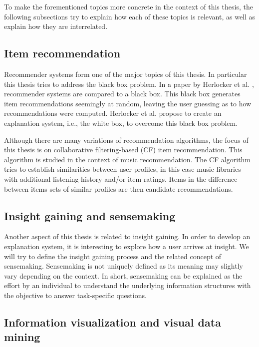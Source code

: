 To make the forementioned topics more concrete in the context of this thesis, the following subsections try to explain how each of these topics is relevant, as well as explain how they are interrelated.


\subsection{Item recommendation}\label{chapter:introduction:section:perspective:subsection:recommendation}

Recommender systems form one of the major topics of this thesis. In particular this thesis tries to address the black box problem. In a paper by Herlocker et al. \cite{herlocker:2000}, recommender systems are compared to a black box. This black box generates item recommendations seemingly at random, leaving the user guessing as to how recommendations were computed. Herlocker et al. propose to create an explanation system, i.e., the white box, to overcome this black box problem.

Although there are many variations of recommendation algorithms, the focus of this thesis is on collaborative filtering-based (CF) item recommendation. This algorithm is studied in the context of music recommendation. The CF algorithm tries to establish similarities between user profiles, in this case music libraries with additional listening history and/or item ratings. Items in the difference between items sets of similar profiles are then candidate recommendations\cite{rajaraman:2012}.


\subsection{Insight gaining and sensemaking}\label{chapter:introduction:section:perspective:subsection:sensemaking}

Another aspect of this thesis is related to insight gaining. In order to develop an explanation system, it is interesting to explore how a user arrives at insight. We will try to define the insight gaining process and the related concept of sensemaking. Sensemaking is not uniquely defined as its meaning may slightly vary depending on the context\cite{yi:2008}. In short, sensemaking can be explained as the effort by an individual to understand the underlying information structures with the objective to answer task-specific questions\cite{russell:1993:CSS:169059.169209, yi:2008}.


\subsection{Information visualization and visual data mining}\label{chapter:introduction:section:perspective:subsection:infovis}

